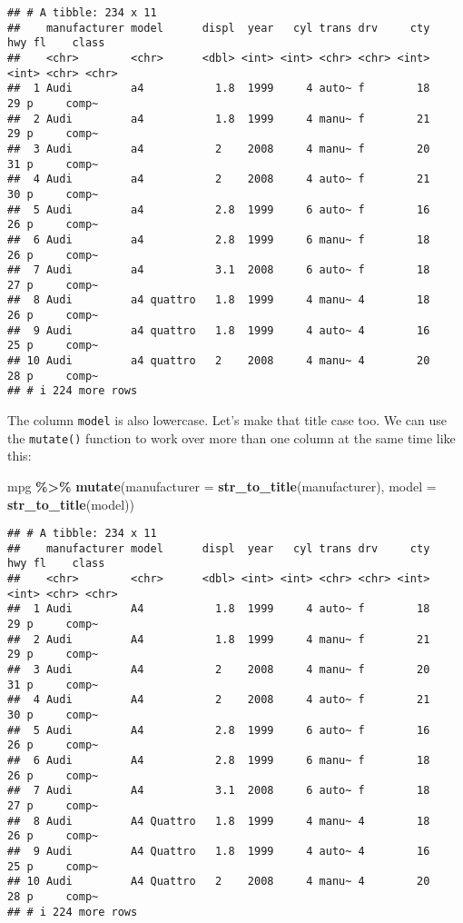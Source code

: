 \documentclass[
]{book}
\newenvironment{Shaded}{\begin{snugshade}}{\end{snugshade}}
\newcommand{\AttributeTok}[1]{\textcolor[rgb]{0.13,0.29,0.53}{#1}}
\newcommand{\FunctionTok}[1]{\textcolor[rgb]{0.13,0.29,0.53}{\textbf{#1}}}
\newcommand{\NormalTok}[1]{#1}
\newcommand{\SpecialCharTok}[1]{\textcolor[rgb]{0.81,0.36,0.00}{\textbf{#1}}}
\begin{document}
\begin{verbatim}
## # A tibble: 234 x 11
##    manufacturer model      displ  year   cyl trans drv     cty   hwy fl    class
##    <chr>        <chr>      <dbl> <int> <int> <chr> <chr> <int> <int> <chr> <chr>
##  1 Audi         a4           1.8  1999     4 auto~ f        18    29 p     comp~
##  2 Audi         a4           1.8  1999     4 manu~ f        21    29 p     comp~
##  3 Audi         a4           2    2008     4 manu~ f        20    31 p     comp~
##  4 Audi         a4           2    2008     4 auto~ f        21    30 p     comp~
##  5 Audi         a4           2.8  1999     6 auto~ f        16    26 p     comp~
##  6 Audi         a4           2.8  1999     6 manu~ f        18    26 p     comp~
##  7 Audi         a4           3.1  2008     6 auto~ f        18    27 p     comp~
##  8 Audi         a4 quattro   1.8  1999     4 manu~ 4        18    26 p     comp~
##  9 Audi         a4 quattro   1.8  1999     4 auto~ 4        16    25 p     comp~
## 10 Audi         a4 quattro   2    2008     4 manu~ 4        20    28 p     comp~
## # i 224 more rows
\end{verbatim}

The column \texttt{model} is also lowercase. Let's make that title case too. We can use the \texttt{mutate()} function to work over more than one column at the same time like this:

\begin{Shaded}
\begin{Highlighting}[]
\NormalTok{mpg }\SpecialCharTok{\%\textgreater{}\%}
  \FunctionTok{mutate}\NormalTok{(}\AttributeTok{manufacturer =} \FunctionTok{str\_to\_title}\NormalTok{(manufacturer), }\AttributeTok{model =} \FunctionTok{str\_to\_title}\NormalTok{(model))}
\end{Highlighting}
\end{Shaded}

\begin{verbatim}
## # A tibble: 234 x 11
##    manufacturer model      displ  year   cyl trans drv     cty   hwy fl    class
##    <chr>        <chr>      <dbl> <int> <int> <chr> <chr> <int> <int> <chr> <chr>
##  1 Audi         A4           1.8  1999     4 auto~ f        18    29 p     comp~
##  2 Audi         A4           1.8  1999     4 manu~ f        21    29 p     comp~
##  3 Audi         A4           2    2008     4 manu~ f        20    31 p     comp~
##  4 Audi         A4           2    2008     4 auto~ f        21    30 p     comp~
##  5 Audi         A4           2.8  1999     6 auto~ f        16    26 p     comp~
##  6 Audi         A4           2.8  1999     6 manu~ f        18    26 p     comp~
##  7 Audi         A4           3.1  2008     6 auto~ f        18    27 p     comp~
##  8 Audi         A4 Quattro   1.8  1999     4 manu~ 4        18    26 p     comp~
##  9 Audi         A4 Quattro   1.8  1999     4 auto~ 4        16    25 p     comp~
## 10 Audi         A4 Quattro   2    2008     4 manu~ 4        20    28 p     comp~
## # i 224 more rows
\end{verbatim}
\end{document}
